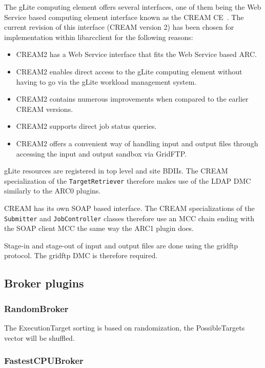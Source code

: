 \documentclass{book}
\newcommand{\arclib}{libarcclient}
\newcommand{\JobController}{\texttt{JobController}}
\newcommand{\TargetRetriever}{\texttt{TargetRetriever}}
\newcommand{\Submitter}{\texttt{Submitter}}
\begin{document}
The gLite computing element offers several interfaces, one of them
being the Web Service based computing element interface known as the
CREAM CE~\cite{cream}. The current revision of this interface (CREAM
version 2) has been chosen for implementation within {\arclib} for the
following reasons:

\begin{itemize}
\item CREAM2 has a Web Service interface that fits the Web Service
  based ARC.
\item CREAM2 enables direct access to the gLite computing element
  without having to go via the gLite workload management system.
\item CREAM2 contains numerous improvements when compared to the
  earlier CREAM versions.
\item CREAM2 supports direct job status queries.
\item CREAM2 offers a convenient way of handling input and output
  files through accessing the input and output sandbox via GridFTP.
\end{itemize}

gLite resources are registered in top level and site BDIIs. The CREAM
specialization of the {\TargetRetriever} therefore makes use of the
LDAP DMC similarly to the ARC0 plugins.

CREAM has its own SOAP based interface. The CREAM
specializations of the {\Submitter} and {\JobController} classes
therefore use an MCC chain ending with the SOAP client MCC the same 
way the ARC1 plugin does.

Stage-in and stage-out of input and output files are done using the
gridftp protocol. The gridftp DMC is therefore required.

\subsection{Broker plugins}

\subsubsection{RandomBroker}

The ExecutionTarget sorting is based on randomization, the PossibleTargets vector will be shuffled.

\subsubsection{FastestCPUBroker}
\end{document}
